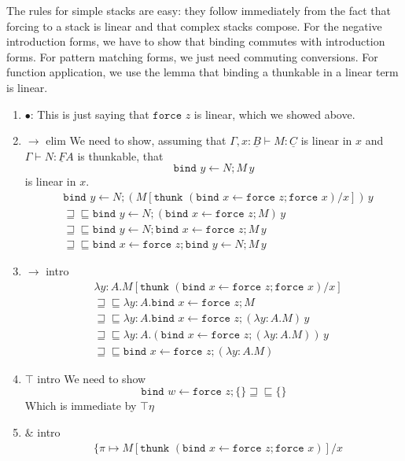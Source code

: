 \documentclass[acmsmall,screen,12pt]{acmart}
\renewcommand{\u}{\underline}
\newcommand{\ltdyn}{\sqsubseteq}
\newcommand{\gtdyn}{\sqsupseteq}
\newcommand{\equidyn}{\mathrel{\gtdyn\ltdyn}}
\newcommand{\pairone}[1]{\{ \pi \mapsto {#1}}
\newcommand{\bindXtoYinZ}[2]{\kw{bind}#2 \leftarrow #1;}
\newcommand{\kw}[1]{\texttt{#1}\,\,}
\newcommand{\thunk}{\kw{thunk}}
\newcommand{\force}{\kw{force}}
\newcommand{\with}{\mathbin{\&}}
\begin{document}
{\begin{longonly}
\begin{longproof}
  The rules for simple stacks are easy: they follow immediately from
  the fact that forcing to a stack is linear and that complex stacks
  compose.  For the negative introduction forms, we have to show that
  binding commutes with introduction forms. For pattern matching
  forms, we just need commuting conversions. For function application,
  we use the lemma that binding a thunkable in a linear term is
  linear.
  \begin{enumerate}
  \item $\bullet$: This is just saying that $\force z$ is linear,
    which we showed above.
  \item $\to$ elim We need to show, assuming that $\Gamma, x : \u B
    \vdash M : \u C$ is linear in $x$ and $\Gamma \vdash N : \u F A$
    is thunkable, that
    \[
    \bindXtoYinZ N y M\,y
    \]
    is linear in $x$.
    \begin{align*}
      &\bindXtoYinZ N y (M[\thunk{(\bindXtoYinZ {\force z} x \force x)}/x])\,y\\
      &\equidyn \bindXtoYinZ N y (\bindXtoYinZ {\force z} x M)\,y \tag{$M$ linear in $x$}\\
      &\equidyn \bindXtoYinZ N y \bindXtoYinZ {\force z} x M\,y \tag{$\u F\eta$}\\
      &\equidyn \bindXtoYinZ {\force z} x \bindXtoYinZ N y M\,y\tag{thunkables are central}
    \end{align*}
  \item $\to$ intro
    \begin{align*}
      & \lambda y:A. M[\thunk{(\bindXtoYinZ {\force z} x \force x)}/x]\\
      &\equidyn \lambda y:A. \bindXtoYinZ {\force z} x M \tag{$M$ is linear}\\
      &\equidyn \lambda y:A. \bindXtoYinZ {\force z} x (\lambda y:A. M)\, y \tag{$\to\beta$}\\
      &\equidyn \lambda y:A. (\bindXtoYinZ {\force z} x (\lambda y:A. M))\, y \tag{$\u F\eta$}\\
      &\equidyn \bindXtoYinZ {\force z} x (\lambda y:A. M) \tag{$\to\eta$}
    \end{align*}
  \item $\top$ intro
    We need to show
    \[ \bindXtoYinZ {\force z} w \{\} \equidyn \{\} \]
    Which is immediate by $\top\eta$
  \item $\with$ intro
    \begin{align*}
      &     \pairone{M[\thunk {(\bindXtoYinZ {\force z} x \force x)}]/x}\\

\end{align*}
\end{enumerate}
\end{longproof}
\end{longonly}}
\end{document}

